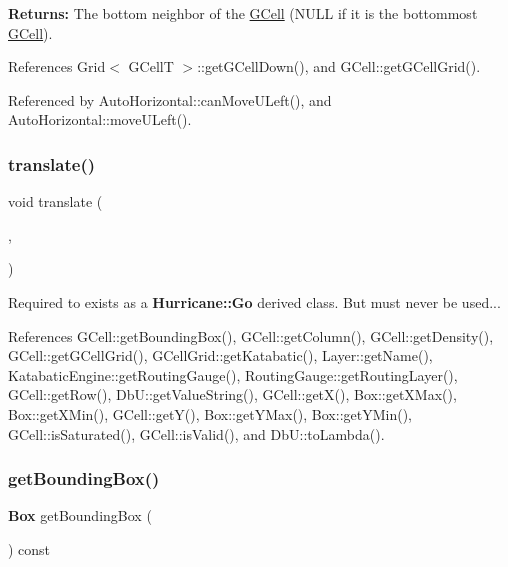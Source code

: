 {\bfseries Returns\+:} The bottom neighbor of the \hyperlink{classKatabatic_1_1GCell}{G\+Cell} ({\ttfamily N\+U\+LL} if it is the bottommost \hyperlink{classKatabatic_1_1GCell}{G\+Cell}). 

References Grid$<$ G\+Cell\+T $>$\+::get\+G\+Cell\+Down(), and G\+Cell\+::get\+G\+Cell\+Grid().



Referenced by Auto\+Horizontal\+::can\+Move\+U\+Left(), and Auto\+Horizontal\+::move\+U\+Left().

\mbox{\label{classKatabatic_1_1GCell_a819f3ffbba69e4de2a19c827676b5aee}} 
\subsubsection{\texorpdfstring{translate()}{translate()}}
{\footnotesize\ttfamily void translate (\begin{DoxyParamCaption}\item[{const \textbf{ Db\+U\+::\+Unit} \&}]{,  }\item[{const \textbf{ Db\+U\+::\+Unit} \&}]{ }\end{DoxyParamCaption})\hspace{0.3cm}{\ttfamily [virtual]}}

Required to exists as a \textbf{ Hurricane\+::\+Go} derived class. But must never be used... 

References G\+Cell\+::get\+Bounding\+Box(), G\+Cell\+::get\+Column(), G\+Cell\+::get\+Density(), G\+Cell\+::get\+G\+Cell\+Grid(), G\+Cell\+Grid\+::get\+Katabatic(), Layer\+::get\+Name(), Katabatic\+Engine\+::get\+Routing\+Gauge(), Routing\+Gauge\+::get\+Routing\+Layer(), G\+Cell\+::get\+Row(), Db\+U\+::get\+Value\+String(), G\+Cell\+::get\+X(), Box\+::get\+X\+Max(), Box\+::get\+X\+Min(), G\+Cell\+::get\+Y(), Box\+::get\+Y\+Max(), Box\+::get\+Y\+Min(), G\+Cell\+::is\+Saturated(), G\+Cell\+::is\+Valid(), and Db\+U\+::to\+Lambda().

\mbox{\label{classKatabatic_1_1GCell_ab5d8bf98ab5af6fcfebea1b9f446d5d7}} 
\subsubsection{\texorpdfstring{get\+Bounding\+Box()}{getBoundingBox()}}
{\footnotesize\ttfamily \textbf{ Box} get\+Bounding\+Box (\begin{DoxyParamCaption}{ }\end{DoxyParamCaption}) const\hspace{0.3cm}{\ttfamily [virtual]}}

